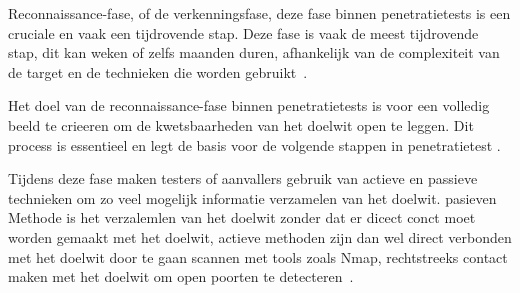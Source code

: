 Reconnaissance-fase, of de verkenningsfase, deze fase binnen penetratietests is een cruciale en vaak 
een tijdrovende stap. Deze fase is vaak de meest tijdrovende stap, dit kan weken of zelfs maanden 
duren, afhankelijk van de complexiteit van de target en de technieken die worden gebruikt~\autocite{Shah}. 

Het doel van de reconnaissance-fase binnen penetratietests is voor een volledig beeld te crieeren om de 
kwetsbaarheden van het doelwit open te leggen. Dit process is essentieel en legt de basis voor de
volgende stappen in penetratietest \autocite{Kothia}.

Tijdens deze fase maken testers of aanvallers gebruik van actieve en passieve technieken om zo veel
mogelijk informatie verzamelen van het doelwit. pasieven Methode is het verzalemlen van het doelwit 
zonder dat er dicect conct moet worden gemaakt met het doelwit, actieve methoden zijn dan wel direct
verbonden met het doelwit door te gaan scannen met tools zoals Nmap, rechtstreeks contact maken met 
het doelwit om open poorten te detecteren~\autocite{Shah}.











